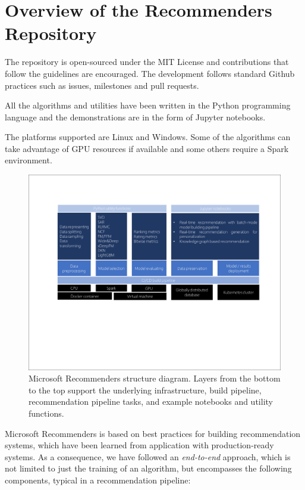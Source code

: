 \section{Overview of the Recommenders Repository}

The repository is open-sourced under the MIT License and contributions that follow the guidelines are encouraged.  
The development follows standard Github practices such as issues, milestones and pull requests.

All the algorithms and utilities have been written in the Python programming language and the demonstrations are 
in the form of Jupyter notebooks.

The platforms supported are Linux and Windows. Some of the algorithms can take advantage of GPU resources if available 
and some others require a Spark environment.

\begin{figure}
  \centering
  \includegraphics[width=\textwidth,keepaspectratio]{platform_diagram_crop.pdf}
  \caption{Microsoft Recommenders structure diagram. Layers from the bottom to the top support the underlying 
  infrastructure, build pipeline, recommendation pipeline tasks, and example notebooks and utility functions.}
\end{figure}

Microsoft Recommenders is based on best practices for building recommendation systems, which have been learned from 
application with production-ready systems. As a consequence, we have followed an {\em end-to-end} approach, which 
is not limited to just the training of an algorithm, but encompasses the following components, typical in a 
recommendation pipeline:

